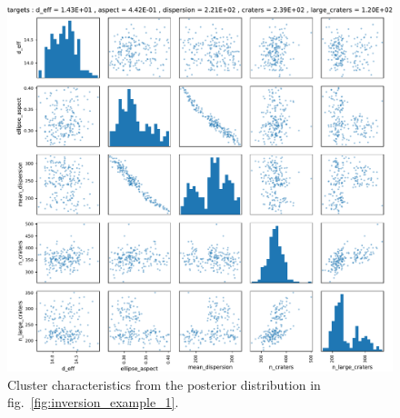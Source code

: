 \begin{figure}
    \centering
    \includegraphics[width=\textwidth]{figures/characteristics_ESP_038458_2030}
    \caption{Cluster characteristics from the posterior distribution in fig.~\ref{fig:inversion_example_1}.}
    \label{fig:inversion_example_2}
\end{figure}